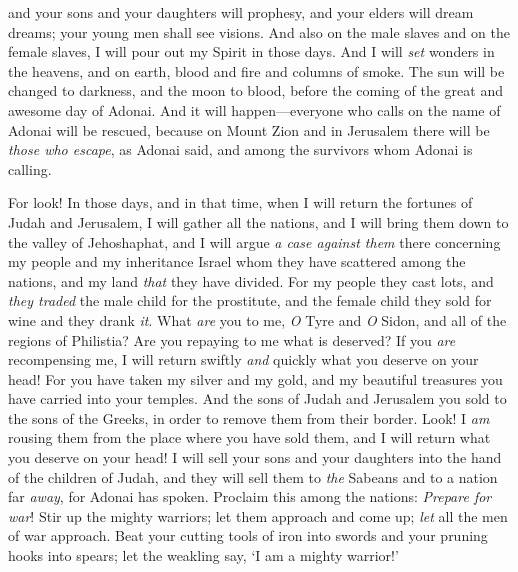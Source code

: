 \begin{biblechapter}
and your sons and your daughters will prophesy, 
and your elders will dream dreams; 
your young men shall see visions.
\verse And also on the male slaves and on the female slaves, 
I will pour out my Spirit in those days.
\verse And I will \textit{set} wonders in the heavens, and on earth, blood and fire and columns of smoke.
\verse The sun will be changed to darkness, and the moon to blood, before the coming of the great and awesome day of Adonai.
\verse And it will happen—everyone who calls on the name of Adonai will be rescued, because on Mount Zion and in Jerusalem there will be \textit{those who escape}, as Adonai said, and among the survivors whom Adonai is calling.
\end{biblechapter}

\begin{biblechapter} %
  For look! In those days, and in that time, when I will return the fortunes of Judah and Jerusalem,
\verse I will gather all the nations, and I will bring them down to the valley of Jehoshaphat, and I will argue \textit{a case against them} there concerning my people and my inheritance Israel whom they have scattered among the nations, and my land \textit{that} they have divided.
\verse For my people they cast lots, and \textit{they traded} the male child for the prostitute, and the female child they sold for wine and they drank \textit{it}.
\verse What \textit{are} you to me, \textit{O} Tyre and \textit{O} Sidon, and all of the regions of Philistia? Are you repaying to me what is deserved? If you \textit{are} recompensing me, I will return swiftly \textit{and} quickly what you deserve on your head!
\verse For you have taken my silver and my gold, and my beautiful treasures you have carried into your temples.
\verse And the sons of Judah and Jerusalem you sold to the sons of the Greeks, in order to remove them from their border.
\verse Look! I \textit{am} rousing them from the place where you have sold them, and I will return what you deserve on your head!
\verse I will sell your sons and your daughters into the hand of the children of Judah, and they will sell them to \textit{the} Sabeans and to a nation far \textit{away}, for Adonai has spoken.
 Proclaim this among the nations: 
\textit{Prepare for war}! 
Stir up the mighty warriors; 
let them approach and come up; 
\textit{let} all the men of war approach.
\verse Beat your cutting tools of iron into swords 
and your pruning hooks into spears; 
let the weakling say, ‘I am a mighty warrior!’

\end{biblechapter}
